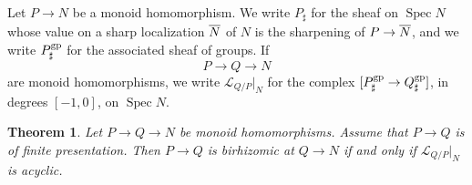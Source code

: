 \documentclass[10pt]{article}
\numberwithin{equation}{section}
\newtheorem{theorem}[paragraph]{Theorem}
\theoremstyle{definition}
\theoremstyle{remark}
\def\Spec{\operatorname{Spec}}
\def\spec{\Spec}
\newcommand{\gp}[1]{#1^{\rm gp}}
\renewcommand{\bar}[1]{\overnorm{#1}\vphantom{#1}}
\newcommand{\shp}[1]{#1_\sharp}
\newcommand{\gs}[1]{\gp{\shp{#1}}}
\def\overnorm#1{\overline{#1}\vphantom{#1}}
\begin{document}
Let $P \to N$ be a monoid homomorphism.  We write $P_\sharp$ for the sheaf on $\spec N$ whose value on a sharp localization $\bar N$ of $N$ is the sharpening of $P \to \bar N$, and we write $\gs P$ for the associated sheaf of groups.  If
\begin{equation*}
	P \to Q \to N
\end{equation*}
are monoid homomorphisms, we write $\mathcal L_{Q/P} \big|_N$ for the complex $[\gs P \to \gs Q]$, in degrees $[-1,0]$, on $\spec N$.







\begin{theorem}\label{thm:rhizomicinflifting}
	Let $P {\to} Q {\to} N$ be monoid homomorphisms.  Assume that $P \to Q$ is of finite presentation.  Then $P \to Q$ is birhizomic at $Q \to N$ if and only if $\mathcal L_{Q/P} \big|_N$ is acyclic.
\end{theorem}
\end{document}
